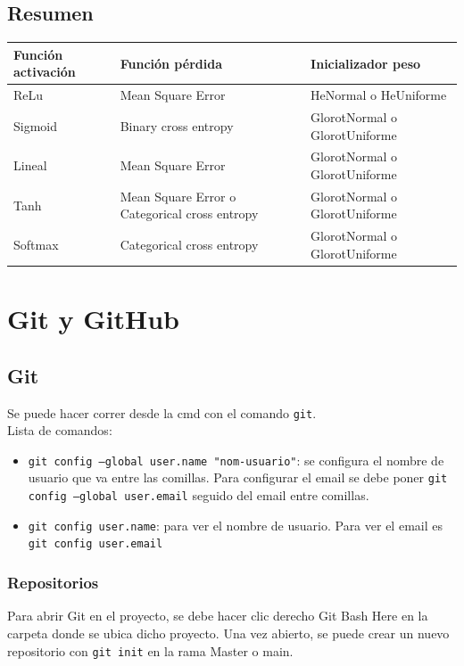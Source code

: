 \documentclass[a4paper, 12pt]{book}
\begin{document}
\newpage
\section{Resumen}
\begin{table}[H]
	\resizebox{15cm}{!} {
	\begin{tabular}{|l|l|l|}
		\hline
		Función activación & Función pérdida & Inicializador peso \\ \hline
		ReLu & Mean Square Error & HeNormal o HeUniforme \\ \hline
		Sigmoid & Binary cross entropy & GlorotNormal o GlorotUniforme \\ \hline
		Lineal & Mean Square Error & GlorotNormal o GlorotUniforme \\ \hline
		Tanh & Mean Square Error o Categorical cross entropy & GlorotNormal o GlorotUniforme \\ \hline
		Softmax & Categorical cross entropy & GlorotNormal o GlorotUniforme \\ \hline
	\end{tabular}
	}
\end{table}
%
\chapter{Git y GitHub}
\section{Git}
Se puede hacer correr desde la cmd con el comando \texttt{git}. \\
Lista de comandos:
\begin{itemize}
\item \texttt{git config --global user.name "nom-usuario"}: se configura el nombre de usuario que va entre las comillas. Para configurar el email se debe poner \texttt{git config --global user.email} seguido del email entre comillas.
\item \texttt{git config user.name}: para ver el nombre de usuario. Para ver el email es \texttt{git config user.email}
\end{itemize}
\subsection{Repositorios}
Para abrir Git en el proyecto, se debe hacer clic derecho Git Bash Here en la carpeta donde se ubica dicho proyecto. Una vez abierto, se puede crear un nuevo repositorio con \texttt{git init} en la rama Master o main.
\end{document}
